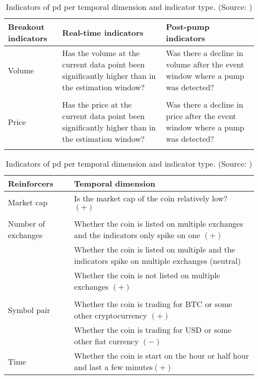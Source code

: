 \begin{table}
    \centering
    \begin{tabular}{p{} p{} p{}}
    \hline
    \textbf{Breakout indicators} &\textbf{Real-time indicators} & \textbf{Post-pump indicators}\\
    \hline
    Volume & Has the volume at the current data point been significantly higher than in the estimation window? & Was there a decline in volume after the event window where a pump was detected?\\\\
    Price & Has the price at the current data point been significantly higher than in the estimation window? & Was there a decline in price after the event window where a pump was detected?\\\\
    \end{tabular}
    
    \begin{tabular}{p{} p{}}
    \hline
    \textbf{Reinforcers} &\textbf{Temporal dimension}\\
    \hline
    Market cap & Is the market cap of the coin relatively low? $(+)$\\\\
    Number of exchanges & Whether the coin is listed on multiple exchanges and the indicators only spike on one $(+)$\\
                        & Whether the coin is listed on multiple and the indicators spike on multiple exchanges (neutral)\\
                        & Whether the coin is not listed on multiple exchanges $(+)$\\\\
    Symbol pair         & Whether the coin is trading for BTC or some other cryptocurrency $(+)$\\
                        & Whether the coin is trading for USD or some other fiat currency $(-)$\\
    Time                & Whether the coin is start on the hour or half hour and last a few minutes$(+)$\\
    \hline
    \end{tabular}
    \caption{Indicators of \ac{pd} per temporal dimension and indicator type. (Source: \cite{P&D_to_the_moon, P&D_anatomy})}
    \label{tab:pd_indicators}
\end{table}